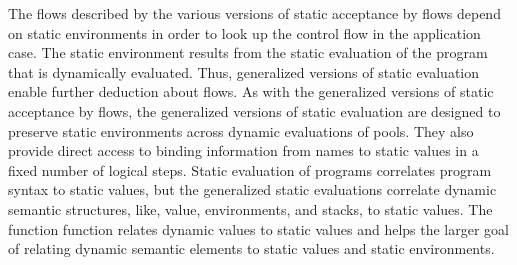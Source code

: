 \documentclass[10pt]{article}
\begin{document}
The flows described by the various versions of static acceptance by flows depend on static
environments in order to look up the control flow in the application case.
The static environment
results from the static evaluation of the program that is dynamically evaluated. Thus,
generalized
versions of static evaluation enable further deduction about flows.
As with the generalized versions of static acceptance by flows,
the generalized versions of static evaluation are designed to
preserve static environments across
dynamic evaluations of pools. They also provide direct access to binding information from names
to static values in a fixed number of logical steps. Static evaluation of programs correlates
program syntax to static values, but the generalized static evaluations correlate dynamic
semantic structures, like, value, environments, and stacks, to static values. The function
function relates dynamic values to static values and helps the larger goal of relating dynamic
semantic elements to static values and static environments.    
\end{document}
